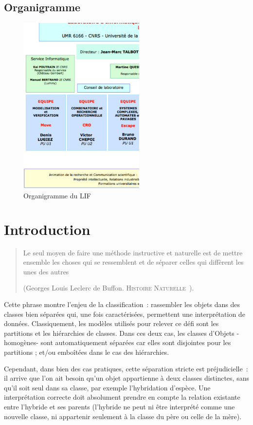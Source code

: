 \documentclass[a4paper]{report}
\begin{document}
\section{Organigramme}
\begin{figure}
\begin{center}
\includegraphics[height=9cm]{images/orgalif.ps}
\end{center}
\caption{Organigramme du LIF}
\end{figure}

\chapter{Introduction}

\label{intro}

\begin{verse}
\og Le seul moyen de faire une méthode instructive et naturelle est de mettre ensemble les choses qui se ressemblent et de séparer celles qui diffèrent
les unes des autres\fg 

(Georges Louis Leclerc de Buffon. \textsc{Histoire Naturelle}~\cite{histoire}).
\end{verse}
Cette phrase montre l'enjeu de la classification~: rassembler les objets dans des classes bien séparées qui, une fois caractérisées, permettent 
une interprétation de données. Classiquement, les modèles utilisés pour relever ce défi sont les partitions et les hiérarchies de classes. Dans ces deux cas, les classes
 d'Objets -homogènes- sont automatiquement séparées car elles sont disjointes pour les partitions ; et/ou emboîtées dans le cas des hiérarchies.

Cependant, dans bien des cas pratiques, cette séparation stricte est préjudi\-cielle~: il arrive que l'on ait besoin qu'un objet appartienne à deux classes distinctes, sans qu'il soit
 seul dans sa classe, par exemple l'hybridation d'espèce. Une interprétation correcte doit absolument prendre en compte la relation existante entre l'hybride 
et ses parents (l'hybride ne peut ni \^etre interprété comme une nouvelle classe, ni appartenir seulement à la classe du père ou celle de la mère).
\end{document}
